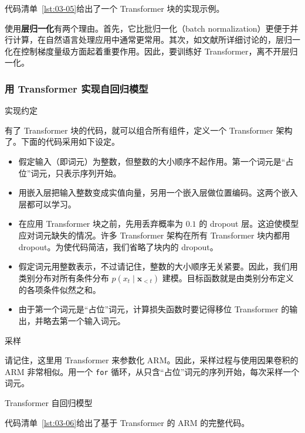 代码清单~\ref{lst:03-05}给出了一个 Transformer 块的实现示例。

使用\textbf{层归一化}有两个理由。首先，它比批归一化（batch normalization）更便于并行计算，在自然语言处理应用中通常更常用。其次，如文献所详细讨论的，层归一化在控制梯度量级方面起着重要作用。因此，要训练好 Transformer，离不开层归一化。

\subsubsection{用 Transformer 实现自回归模型}

\par\medskip\noindent 实现约定\par\nobreak\smallskip
有了 Transformer 块的代码，就可以组合所有组件，定义一个 Transformer 架构了。下面的代码采用如下设定。
\begin{itemize}
\item 假定输入（即词元）为整数，但整数的大小顺序不起作用。第一个词元是“占位”词元，只表示序列开始。
\item 用嵌入层把输入整数变成实值向量，另用一个嵌入层做位置编码。这两个嵌入层都可以学习。
\item 在应用 Transformer 块之前，先用丢弃概率为 $0.1$ 的 dropout 层。这迫使模型应对词元缺失的情况。许多 Transformer 架构在所有 Transformer 块内都用 dropout。为使代码简洁，我们省略了块内的 dropout。
\item 假定词元用整数表示，不过请记住，整数的大小顺序无关紧要。因此，我们用类别分布对所有条件分布 $p(x_t\mid\mathbf{x}_{<t})$ 建模。目标函数就是由类别分布定义的各项条件似然之和。
\item 由于第一个词元是“占位”词元，计算损失函数时要记得移位 Transformer 的输出，并略去第一个输入词元。
\end{itemize}

\par\medskip\noindent 采样\par\nobreak\smallskip
请记住，这里用 Transformer 来参数化 ARM。因此，采样过程与使用因果卷积的 ARM 非常相似。用一个 \texttt{for} 循环，从只含“占位”词元的序列开始，每次采样一个词元。

\par\medskip\noindent Transformer 自回归模型\par\nobreak\smallskip
代码清单~\ref{lst:03-06}给出了基于 Transformer 的 ARM 的完整代码。

